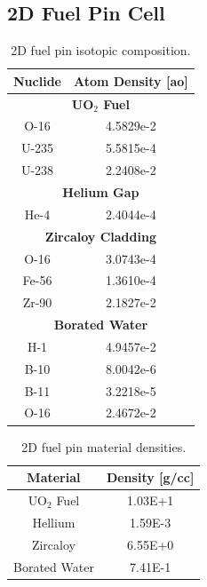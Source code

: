 \subsection{2D Fuel Pin Cell}
\label{subsec:chap4-pin}

\begin{table}[h!]
  \centering
  \caption{2D fuel pin isotopic composition.}
  \label{table:chap2-pin-isotopes} 
  \vspace{14pt}
  \begin{tabular}{c c}
  \toprule
  \multicolumn{1}{c}{\bf Nuclide} &
  \multicolumn{1}{c}{\bf Atom Density [ao]} \\
  \midrule
  \multicolumn{2}{c}{\bf UO$_2$ Fuel} \\
  \midrule
  O-16 & 4.5829e-2 \\
  U-235 & 5.5815e-4 \\
  U-238 & 2.2408e-2 \\
  \midrule
  \multicolumn{2}{c}{\bf Helium Gap} \\
  \midrule
  He-4 & 2.4044e-4 \\
  \midrule
  \multicolumn{2}{c}{\bf Zircaloy Cladding} \\
  \midrule
  O-16 & 3.0743e-4 \\
  Fe-56 & 1.3610e-4 \\
  Zr-90 & 2.1827e-2 \\
  \midrule
  \multicolumn{2}{c}{\bf Borated Water}  \\
  \midrule
  H-1 & 4.9457e-2 \\
  B-10 & 8.0042e-6 \\
  B-11 & 3.2218e-5 \\
  O-16 & 2.4672e-2 \\
  \bottomrule
\end{tabular}
\end{table}

\begin{table}[h!]
  \centering
  \caption{2D fuel pin material densities.}
  \label{table:chap2-pin-densities} 
  \vspace{14pt}
  \begin{tabular}{c c}
  \toprule
  \multicolumn{1}{c}{\bf Material} &
  \multicolumn{1}{c}{\bf Density [g/cc]} \\
  \midrule
  UO$_2$ Fuel & 1.03E+1 \\
  Hellium & 1.59E-3 \\
  Zircaloy & 6.55E+0 \\
  Borated Water & 7.41E-1 \\   
  \bottomrule
\end{tabular}
\end{table}


